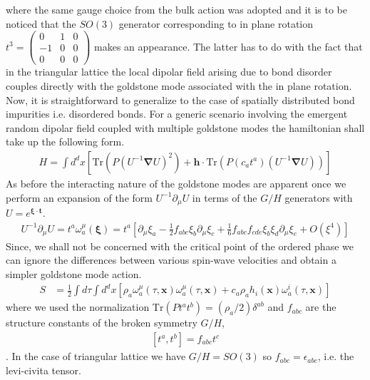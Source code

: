 \documentclass[notitlepage,onecolumn,showpacs,11pt]{revtex4-1}
\newcommand{\bsym}[1]{\boldsymbol{#1}}
\newcommand{\mbf}[1]{\mathbf{#1}}
\newcommand{\grad}{\boldsymbol{\nabla}}
\newcommand{\Tr}{\text{Tr}}
\begin{document}
where the same gauge choice from the bulk action was adopted and it is to be noticed that the 
$SO(3)$ generator corresponding to in plane rotation 
$t^3=\begin{pmatrix}0&1&0\\-1&0&0\\0&0&0\end{pmatrix}$ makes an appearance. The latter has to do 
with the fact that in the triangular lattice the local dipolar field arising due to bond disorder 
couples directly with the goldstone mode associated with the in plane rotation. Now, it is 
straightforward to generalize to the case of spatially distributed bond impurities i.e. disordered
bonds. For a generic scenario involving the emergent random dipolar field coupled with multiple 
goldstone modes the hamiltonian shall take up the following form.
\begin{equation}
    \begin{aligned}
        H = \int d^dx\left[
            \Tr\left(P(U^{-1}\grad U)^2\right)
            +\mbf{h}\cdot\Tr\left(P(c_a t^a)(U^{-1}\grad U)\right)
        \right]
    \end{aligned}
\end{equation}
As before the interacting nature of the goldstone modes are apparent once we perform an expansion
of the form $U^{-1}\partial_\mu U$ in terms of the $G/H$ generators with 
$U=e^{\bsym{\xi}\cdot\mbf{t}}$.
\begin{equation}
    \begin{aligned}
        U^{-1}\partial_\mu U = t^a\omega^\mu_a(\bsym{\xi})
        = t^a\left[
            \partial_\mu\xi_a
            -\frac{1}{2}f_{abc}\xi_b\partial_\mu\xi_c
            +\frac{1}{6}f_{abc}f_{cde}\xi_b\xi_d\partial_\mu\xi_e
            +O(\xi^4)
            \right]
    \end{aligned}
\end{equation}
Since, we shall not be concerned with the critical point of the ordered phase we can ignore the 
differences between various spin-wave velocities and obtain a simpler goldstone mode action.
\begin{equation}
    \begin{aligned}
        S &= \frac{1}{2}\int d\tau\int d^dx\left[
            \rho_a\omega^\mu_a(\tau,\mbf{x})\omega^\mu_a(\tau,\mbf{x})
            +c_a\rho_ah_i(\mbf{x})\omega^i_a(\tau,\mbf{x})
        \right]
    \end{aligned}
\end{equation}
where we used the normalization $\Tr(Pt^at^b)=(\rho_a/2)\delta^{ab}$ and $f_{abc}$ are the 
structure constants of the broken symmetry $G/H$,
\begin{equation}
    \begin{aligned}
        \left[t^a,t^b\right]=f_{abc}t^c
    \end{aligned}
\end{equation}
. In the case of triangular lattice we have $ G/H = SO(3)$ so $f_{abc}=\epsilon_{abc}$, i.e. 
the levi-civita tensor.
\end{document}
